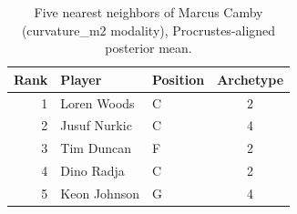 \begin{table}[htbp]
  \centering\small
  \begin{tabular}{rllc}
    \toprule
    Rank & Player & Position & Archetype \\
    \midrule
    1 & Loren Woods & C & 2 \\
    2 & Jusuf Nurkic & C & 4 \\
    3 & Tim Duncan & F & 2 \\
    4 & Dino Radja & C & 2 \\
    5 & Keon Johnson & G & 4 \\
    \bottomrule
  \end{tabular}
  \caption{Five nearest neighbors of Marcus Camby (curvature_m2 modality), Procrustes-aligned posterior mean.}
  \label{tab:Marcus_Camby_neighbors_curvature_m2}
\end{table}

